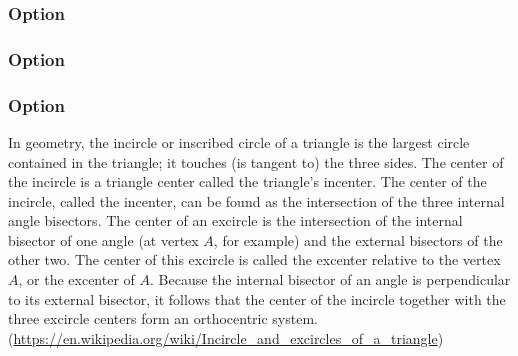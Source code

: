 \begin{tkzexample}[latex=5cm,small]
\end{tkzexample}

\subsubsection{Option }
\begin{tkzexample}[latex=5cm,small]
\end{tkzexample}

\subsubsection{Option }
\begin{tkzexample}[latex=6cm,small]
\end{tkzexample}

\subsubsection{Option }
In geometry, the incircle or inscribed circle of a triangle is the largest circle contained in the triangle; it touches (is tangent to) the three sides. The center of the incircle is a triangle center called the triangle's incenter.
The center of the incircle, called the incenter, can be found as the intersection of the three internal angle bisectors. The center of an excircle is the intersection of the internal bisector of one angle (at vertex $A$, for example) and the external bisectors of the other two. The center of this excircle is called the excenter relative to the vertex $A$, or the excenter of $A$. Because the internal bisector of an angle is perpendicular to its external bisector, it follows that the center of the incircle together with the three excircle centers form an orthocentric system.(\url{https://en.wikipedia.org/wiki/Incircle_and_excircles_of_a_triangle})
 
